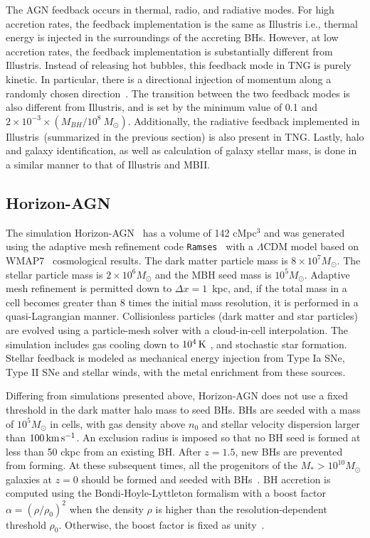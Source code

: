 \documentclass[twocolumn]{aastex631}
\def\smass{{$M_*$}}
\begin{document}
The AGN feedback occurs in thermal, radio, and radiative modes. For high accretion rates, the feedback implementation is the same as Illustris i.e., thermal energy is injected in the surroundings of the accreting BHs. However, at low accretion rates, the feedback implementation is substantially different from Illustris. Instead of releasing hot bubbles, this feedback mode in TNG is purely kinetic. In particular, there is a directional injection of momentum along a randomly chosen direction~\citep{2017MNRAS.465.3291W, 2018MNRAS.479.4056W}. %
The transition between the two feedback modes is also different from Illustris, and is set by the minimum value of 0.1 and $2 \times 10 ^{-3} \times (M_{BH} / 10^8~M_{\odot})$. Additionally, the radiative feedback implemented in Illustris~(summarized in the previous section) is also present in TNG. Lastly, halo and galaxy identification, as well as calculation of galaxy stellar mass, is done in a similar manner to that of Illustris and MBII.

\subsection{Horizon-AGN}\label{subsec:Horizon}
The simulation Horizon-AGN~\citep{2014MNRAS.444.1453D, 2016MNRAS.463.3948D} has a volume of 142 cMpc$^3$ and was generated using the adaptive mesh refinement code {\tt Ramses}~\citep{2002A&A...385..337T} with a $\Lambda$CDM model based on WMAP7~\citep{2011ApJS..192...18K} cosmological results. The dark matter particle mass is $8\times 10^7 M_{\odot}$. The stellar particle mass is $2\times 10^6 M_{\odot}$ and the MBH seed mass is $10^5 M_{\odot}$. Adaptive mesh refinement is permitted down to $\Delta x=1$~kpc, and, if the total mass in a cell becomes greater than 8 times the initial mass resolution, it is performed in a quasi-Lagrangian manner. Collisionless particles (dark matter and star particles) are evolved using a particle-mesh solver with a cloud-in-cell interpolation.
The simulation includes gas cooling down to $10^4\, \rm K$ \citep{sutherland&dopita93}, and stochastic star formation. Stellar feedback is modeled as mechanical energy injection from Type Ia SNe, Type II SNe and stellar winds, with the metal enrichment from these sources.

Differing from simulations presented above, Horizon-AGN does not use a fixed threshold in the dark matter halo mass to seed BHs.  BHs are seeded with a mass of $10^5 M_\odot$ in cells, with gas density above $n_0$ and stellar velocity dispersion larger than $100 \,\rm km\,s^{-1}$. An exclusion radius is imposed so that no BH seed is formed at less than 50 ckpc from an existing BH. After $z = 1.5$, new BHs are prevented from forming. At these subsequent times, all the progenitors of the \smass$>10^{10} M_{\odot}$ galaxies at $z = 0$ should be formed and seeded with BHs~\citep{2016MNRAS.460.2979V}.  BH accretion is computed using the Bondi-Hoyle-Lyttleton formalism with a boost factor $\alpha = (\rho/\rho_0)^2$ when the density $\rho$ is higher than the resolution-dependent threshold $\rho_0$. Otherwise, the boost factor is fixed as unity~\citep{2009MNRAS.398...53B}.
\end{document}
